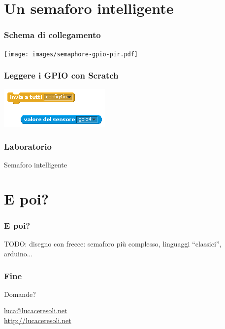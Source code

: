 \documentclass[xetex,table]{beamer}
\begin{document}
\section{Un semaforo intelligente}

\begin{frame}
  \frametitle{Schema di collegamento}
  \begin{center}
    \texttt{[image: images/semaphore-gpio-pir.pdf]}
  \end{center}
\end{frame}

\begin{frame}
  \frametitle{Leggere i GPIO con Scratch}
  \begin{center}
    \includegraphics[height=0.25\textheight]{images/sketch-gpioserver2.png}
  \end{center}
\end{frame}

\begin{frame}
\frametitle{Laboratorio}
  \begin{center}
    \LARGE
    Semaforo intelligente
  \end{center}
\end{frame}

\section{E poi?}

\begin{frame}
  \frametitle{E poi?}
  TODO: disegno con frecce: semaforo più complesso, linguaggi ``classici'', arduino...
\end{frame}

\begin{frame}
  \frametitle{Fine}

  \begin{center}
    {\Huge Domande?}

    \vspace{0.1\textheight}

    \href{mailto:luca@lucaceresoli.net}{luca@lucaceresoli.net}\\
    \url{http://lucaceresoli.net}
  \end{center}
\end{frame}
\end{document}
